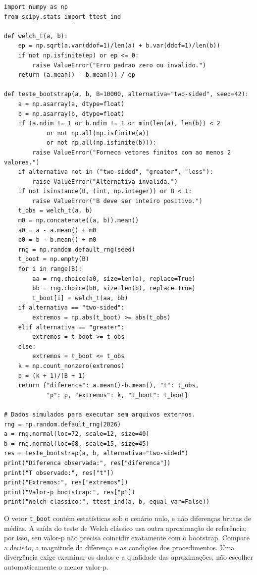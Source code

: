 \documentclass[12pt,a4paper]{article}
\begin{document}
\begin{lstlisting}[caption={Bootstrap studentizado sob igualdade de medias.},label={lst:teste}]
import numpy as np
from scipy.stats import ttest_ind

def welch_t(a, b):
    ep = np.sqrt(a.var(ddof=1)/len(a) + b.var(ddof=1)/len(b))
    if not np.isfinite(ep) or ep <= 0:
        raise ValueError("Erro padrao zero ou invalido.")
    return (a.mean() - b.mean()) / ep

def teste_bootstrap(a, b, B=10000, alternativa="two-sided", seed=42):
    a = np.asarray(a, dtype=float)
    b = np.asarray(b, dtype=float)
    if (a.ndim != 1 or b.ndim != 1 or min(len(a), len(b)) < 2
            or not np.all(np.isfinite(a))
            or not np.all(np.isfinite(b))):
        raise ValueError("Forneca vetores finitos com ao menos 2 valores.")
    if alternativa not in ("two-sided", "greater", "less"):
        raise ValueError("Alternativa invalida.")
    if not isinstance(B, (int, np.integer)) or B < 1:
        raise ValueError("B deve ser inteiro positivo.")
    t_obs = welch_t(a, b)
    m0 = np.concatenate((a, b)).mean()
    a0 = a - a.mean() + m0
    b0 = b - b.mean() + m0
    rng = np.random.default_rng(seed)
    t_boot = np.empty(B)
    for i in range(B):
        aa = rng.choice(a0, size=len(a), replace=True)
        bb = rng.choice(b0, size=len(b), replace=True)
        t_boot[i] = welch_t(aa, bb)
    if alternativa == "two-sided":
        extremos = np.abs(t_boot) >= abs(t_obs)
    elif alternativa == "greater":
        extremos = t_boot >= t_obs
    else:
        extremos = t_boot <= t_obs
    k = np.count_nonzero(extremos)
    p = (k + 1)/(B + 1)
    return {"diferenca": a.mean()-b.mean(), "t": t_obs,
            "p": p, "extremos": k, "t_boot": t_boot}

# Dados simulados para executar sem arquivos externos.
rng = np.random.default_rng(2026)
a = rng.normal(loc=72, scale=12, size=40)
b = rng.normal(loc=68, scale=15, size=45)
res = teste_bootstrap(a, b, alternativa="two-sided")
print("Diferenca observada:", res["diferenca"])
print("T observado:", res["t"])
print("Extremos:", res["extremos"])
print("Valor-p bootstrap:", res["p"])
print("Welch classico:", ttest_ind(a, b, equal_var=False))
\end{lstlisting}
O vetor \texttt{t\_boot} contém estatísticas sob o cenário nulo, e não diferenças brutas de médias. A saída do teste de Welch clássico usa outra aproximação de referência; por isso, seu valor-p não precisa coincidir exatamente com o bootstrap. Compare a decisão, a magnitude da diferença e as condições dos procedimentos. Uma divergência exige examinar os dados e a qualidade das aproximações, não escolher automaticamente o menor valor-p.
\end{document}
